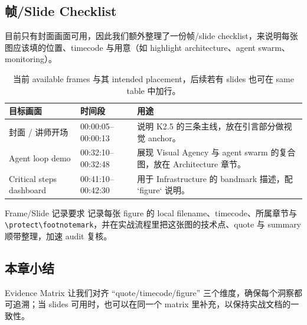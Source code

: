 \subsection{帧/Slide Checklist}
目前只有封面画面可用，因此我们额外整理了一份帧/slide checklist，来说明每张图应该填的位置、timecode 与用意（如 highlight architecture、agent swarm、monitoring）。

\begin{table}[H]
\footnotesize
\centering
\begin{tabular}{p{3cm}p{4cm}p{5cm}}
\toprule
目标画面 & 时间段 & 用途 \\
\midrule
封面 / 讲师开场 & 00:00:05--00:00:13 & 说明 K2.5 的三条主线，放在引言部分做视觉 anchor。 \\
Agent loop demo & 00:32:10--00:32:48 & 展现 Visual Agency 与 agent swarm 的复合图，放在 Architecture 章节。 \\
Critical steps dashboard & 00:41:10--00:42:30 & 用于 Infrastructure 的 bandmark 描述，配 `figure` 说明。 \\
\bottomrule
\end{tabular}
\caption{当前 available frames 与其 intended placement，后续若有 slides 也可在 same table 中加行。}
\end{table}

\begin{importantbox}{Frame/Slide 记录要求}
记录每张 figure 的 local filename、timecode、所属章节与 \verb|\protect\footnotemark|，并在实战流程里把这张图的技术点、quote 与 summary 顺带整理，加速 audit 复核。
\end{importantbox}

\subsection{本章小结}
Evidence Matrix 让我们对齐 ``quote/timecode/figure'' 三个维度，确保每个洞察都可追溯；当 slides 可用时，也可以在同一个 matrix 里补充，以保持实战文档的一致性。

